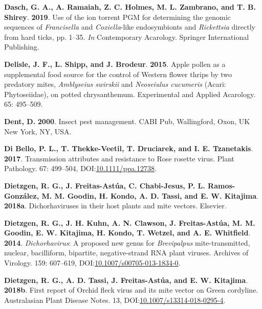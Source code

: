 \documentclass[12pt,final,CPage]{ufthesis}
\newlength{\cslhangindent}
\newenvironment{CSLReferences}[2] %
{%
	\setlength{\parindent}{0pt}
	\ifodd #1 \everypar{\setlength{\hangindent}{\cslhangindent}}\ignorespaces\fi
	\ifnum #2 > 0
	\setlength{\parskip}{#2\baselineskip}
	\fi
}%
{}
\begin{document}
{\begin{CSLReferences}{1}{0}
  \leavevmode{}%
  \textbf{Dasch, G. A., A. Ramaiah, Z. C. Holmes, M. L. Zambrano, and T. B. Shirey}. \textbf{2019}. Use of the ion torrent {PGM} for determining the genomic sequences of {\emph{Francisella}} and {\emph{Coxiella}}-like endosymbionts and {\emph{Rickettsia}} directly from hard ticks, pp. 1--35. \emph{In} Contemporary Acarology. Springer International Publishing.

  \leavevmode{}%
  \textbf{Delisle, J. F., L. Shipp, and J. Brodeur}. \textbf{2015}. Apple pollen as a supplemental food source for the control of {Western flower thrips} by two predatory mites, {\emph{Amblyseius swirskii}} and {\emph{Neoseiulus cucumeris}} {({Acari}: {Phytoseiidae})}, on potted chrysanthemum. Experimental and Applied Acarology. 65: 495--509.

  \leavevmode{}%
  \textbf{Dent, D.} \textbf{2000}. Insect pest management. CABI Pub, Wallingford, Oxon, UK New York, NY, USA.

  \leavevmode{}%
  \textbf{Di Bello, P. L., T. Thekke-Veetil, T. Druciarek, and I. E. Tzanetakis}. \textbf{2017}. Transmission attributes and resistance to {Rose rosette virus}. Plant Pathology. 67: 499--504, DOI:\href{https://doi.org/10.1111/ppa.12738}{10.1111/ppa.12738}.

  \leavevmode{}%
  \textbf{Dietzgen, R. G., J. Freitas-Astúa, C. Chabi-Jesus, P. L. Ramos-González, M. M. Goodin, H. Kondo, A. D. Tassi, and E. W. Kitajima}. \textbf{2018a}. Dichorhaviruses in their host plants and mite vectors. Elsevier.

  \leavevmode{}%
  \textbf{Dietzgen, R. G., J. H. Kuhn, A. N. Clawson, J. Freitas-Astúa, M. M. Goodin, E. W. Kitajima, H. Kondo, T. Wetzel, and A. E. Whitfield}. \textbf{2014}. {\emph{Dichorhavirus}}: A proposed new genus for {\emph{Brevipalpus}} mite-transmitted, nuclear, bacilliform, bipartite, negative-strand {RNA} plant viruses. Archives of Virology. 159: 607--619, DOI:\href{https://doi.org/10.1007/s00705-013-1834-0}{10.1007/s00705-013-1834-0}.

  \leavevmode{}%
  \textbf{Dietzgen, R. G., A. D. Tassi, J. Freitas-Astúa, and E. W. Kitajima}. \textbf{2018b}. First report of {Orchid fleck virus} and its mite vector on {Green cordyline}. Australasian Plant Disease Notes. 13, DOI:\href{https://doi.org/10.1007/s13314-018-0295-4}{10.1007/s13314-018-0295-4}.


\end{CSLReferences}}
\end{document}
